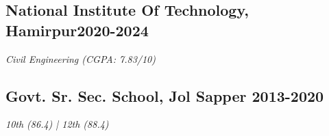 \vspace*{10pt}
\subsection {{National Institute Of Technology, Hamirpur}\hfill 2020-2024}
\vspace*{3pt}
\textit{Civil Engineering (CGPA: 7.83/10)}

\vspace*{6pt}
\subsection{{Govt. Sr. Sec. School, Jol Sapper }\hfill 2013-2020}
\vspace*{3pt}
\textit{10th (86.4) | 12th (88.4)}
\vspace*{10pt}
